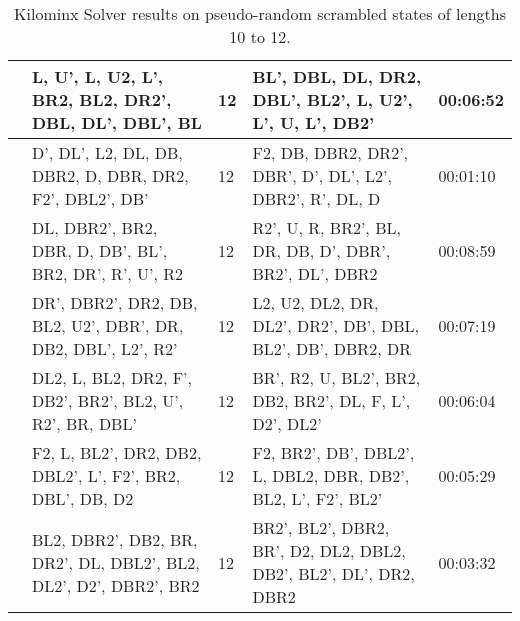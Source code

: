 \begin{table}[h]
{\begin{tabular}{|p{2cm}|p{7cm}|p{2cm}|p{7cm}|p{2.8cm}|}
 & L, U', L, U2, L', BR2, BL2,   DR2', DBL, DL', DBL', BL & 12 & BL', DBL, DL, DR2, DBL', BL2',   L, U2', L', U, L', DB2' & 00:06:52 \\ \hline
 & D', DL', L2, DL, DB, DBR2, D,   DBR, DR2, F2', DBL2', DB' & 12 & F2, DB, DBR2, DR2', DBR', D',   DL', L2', DBR2', R', DL, D & 00:01:10 \\ \hline
 & DL, DBR2', BR2, DBR, D, DB',   BL', BR2, DR', R', U', R2 & 12 & R2', U, R, BR2', BL, DR, DB, D',   DBR', BR2', DL', DBR2 & 00:08:59 \\ \hline
 & DR', DBR2', DR2, DB, BL2, U2',   DBR', DR, DB2, DBL', L2', R2' & 12 & L2, U2, DL2, DR, DL2', DR2',   DB', DBL, BL2', DB', DBR2, DR & 00:07:19 \\ \hline
 & DL2, L, BL2, DR2, F', DB2',   BR2', BL2, U', R2', BR, DBL' & 12 & BR', R2, U, BL2', BR2, DB2,   BR2', DL, F, L', D2', DL2' & 00:06:04 \\ \hline
 & F2, L, BL2', DR2, DB2, DBL2',   L', F2', BR2, DBL', DB, D2 & 12 & F2, BR2', DB', DBL2', L, DBL2,   DBR, DB2', BL2, L', F2', BL2' & 00:05:29 \\ \hline
 & BL2, DBR2', DB2, BR, DR2', DL,   DBL2', BL2, DL2', D2', DBR2', BR2 & 12 & BR2', BL2', DBR2, BR', D2, DL2,   DBL2, DB2', BL2', DL', DR2, DBR2 & 00:03:32 \\ \hline
\end{tabular}%
}
\centering
\caption{Kilominx Solver results on pseudo-random scrambled states of lengths 10 to 12.}
\label{tab:results-1}
\end{table}

